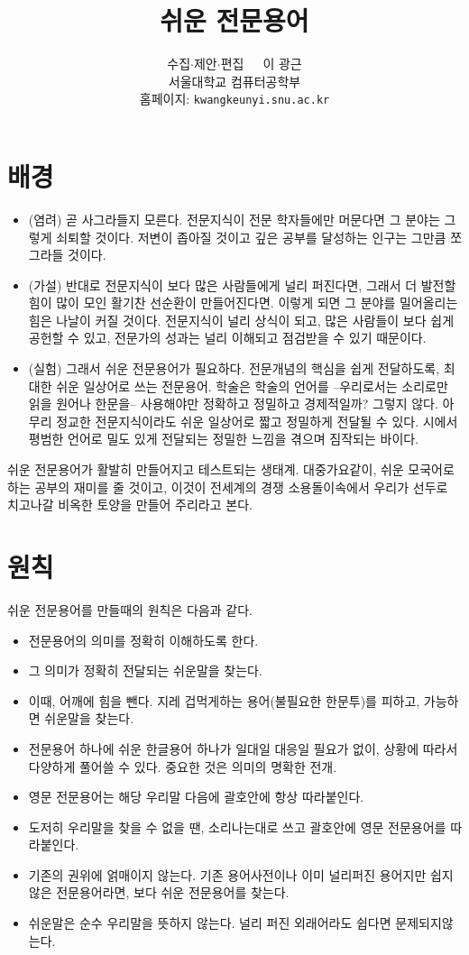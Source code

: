 \documentclass[11pt]{article}
\title{쉬운 전문용어}
\author{수집\(\cdot\)제안\(\cdot\)편집\ \ \  이 광근\\
  서울대학교 컴퓨터공학부\\
  홈페이지: \texttt{kwangkeunyi.snu.ac.kr}
}
\date{}
\begin{document}
\maketitle

\section*{배경}
\begin{itemize}
\item (염려) 곧 사그라들지 모른다. 전문지식이 전문 학자들에만 머문다면 그 분야는
그렇게 쇠퇴할 것이다. 저변이 좁아질 것이고 깊은 공부를 달성하는 인구는
그만큼 쪼그라들 것이다.

\item (가설) 반대로 전문지식이 보다 많은 사람들에게 널리 퍼진다면, 그래서 더 발전할
힘이 많이 모인 활기찬 선순환이 만들어진다면. 이렇게 되면 그 분야를
밀어올리는 힘은 나날이 커질 것이다. 전문지식이 널리 상식이 되고, 많은
사람들이 보다 쉽게 공헌할 수 있고, 전문가의 성과는 널리 
이해되고 점검받을 수 있기 때문이다.

\item (실험) 그래서 쉬운 전문용어가 필요하다. 전문개념의 핵심을 쉽게 전달하도록,
최대한 쉬운 일상어로 쓰는 전문용어. 학술은 학술의 언어를
--우리로서는 소리로만 읽을 원어나 한문을-- 사용해야만 정확하고
정밀하고 경제적일까? 그렇지 않다. 아무리 정교한 전문지식이라도 쉬운
일상어로 짧고 정밀하게 전달될 수 있다. 시에서 평범한 언어로 밀도 있게
전달되는 정밀한 느낌을 겪으며 짐작되는 바이다.
\end{itemize}

쉬운 전문용어가 활발히 만들어지고 테스트되는 생태계. 대중가요같이,
쉬운 모국어로 하는 공부의 재미를 줄 것이고, 이것이 전세계의 경쟁
소용돌이속에서 우리가 선두로 치고나갈 비옥한 토양을 만들어 주리라고 본다.

\section*{원칙}
쉬운 전문용어를 만들때의 원칙은 다음과 같다.
\begin{itemize}
\item 전문용어의 의미를 정확히 이해하도록 한다.
\item 그 의미가 정확히 전달되는 쉬운말을 찾는다.
\item 이때, 어깨에 힘을 뺀다. 지레 겁먹게하는 용어(불필요한 한문투)를
  피하고, 가능하면 쉬운말을 찾는다. 
\item 전문용어 하나에 쉬운 한글용어 하나가 일대일 대응일 필요가 없이,
  상황에 따라서 다양하게 풀어쓸 수 있다. 중요한 것은 의미의 명확한
  전개.
\item 영문 전문용어는 해당 우리말 다음에 괄호안에 항상 따라붙인다.
\item 도저히 우리말을 찾을 수 없을 땐, 소리나는대로 쓰고 괄호안에 영문
  전문용어를 따라붙인다. 
\item 기존의 권위에 얽매이지 않는다. 기존 용어사전이나 이미 널리퍼진
  용어지만 쉽지않은 전문용어라면, 보다 쉬운 전문용어를 찾는다.
\item 쉬운말은 순수 우리말을 뜻하지 않는다. 널리 퍼진 외래어라도
  쉽다면 문제되지않는다.
\end{itemize}



\printindex
\end{document}
